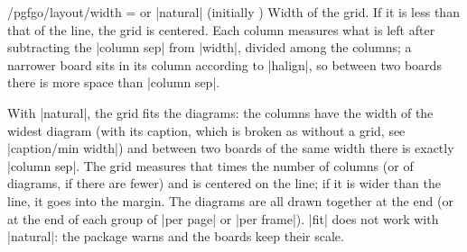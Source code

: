 \begin{key}{/pgfgo/layout/width =  or |natural| (initially \texttt{\string\linewidth})}
	Width of the grid. If it is less than that of the line, the grid is centered. Each column measures what is left after subtracting the |column sep| from |width|, divided among the columns; a narrower board sits in its column according to |halign|, so between two boards there is more space than |column sep|.

	With |natural|, the grid fits the diagrams: the columns have the width of the widest diagram (with its caption, which is broken as without a grid, see |caption/min width|) and between two boards of the same width there is exactly |column sep|. The grid measures that times the number of columns (or of diagrams, if there are fewer) and is centered on the line; if it is wider than the line, it goes into the margin. The diagrams are all drawn together at the end (or at the end of each group of |per page| or |per frame|). |fit| does not work with |natural|: the package warns and the boards keep their scale.

	\begin{codeexample}
		\begin{pgfgolayout}[columns = 2, width = natural, column sep = 0em, row sep = 0em]
			\begin{goban}[partial = A9:E5, scale = 0.5]\end{goban}
			\begin{goban}[partial = E9:I5, scale = 0.5]\end{goban}
			\begin{goban}[partial = A1:E5, scale = 0.5]\end{goban}
			\begin{goban}[partial = E1:I5, scale = 0.5]\end{goban}
		\end{pgfgolayout}
	\end{codeexample}

	\begin{pgfgolayout}[columns = 2, width = natural, column sep = 0em, row sep = 0em]
		\begin{goban}[partial = A9:E5, scale = 0.5]\end{goban}
		\begin{goban}[partial = E9:I5, scale = 0.5]\end{goban}
		\begin{goban}[partial = A1:E5, scale = 0.5]\end{goban}
		\begin{goban}[partial = E1:I5, scale = 0.5]\end{goban}
	\end{pgfgolayout}
\end{key}

